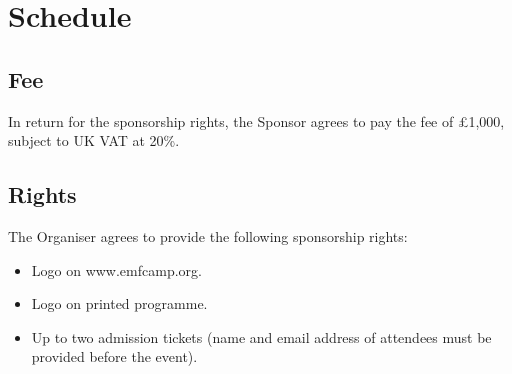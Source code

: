 \section*{Schedule}

\subsection*{Fee}

In return for the sponsorship rights, the Sponsor agrees to pay the fee of £1,000, subject to UK VAT at 20\%.

\subsection*{Rights}

The Organiser agrees to provide the following sponsorship rights:

\begin{itemize}
    \item Logo on www.emfcamp.org.
    \item Logo on printed programme.
    \item Up to two admission tickets (name and email address of attendees must be provided before the event).
\end{itemize}
